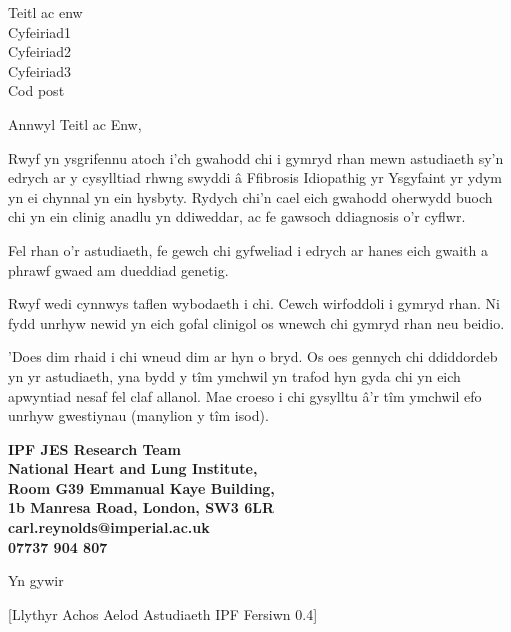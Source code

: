 \documentclass[ipfjes-centre-welsh,letterpaper,pagesize,UScommercial9]{scrlttr2}
\begin{document}
\begin{letter}{Teitl ac enw\\ Cyfeiriad1 \\ Cyfeiriad2 \\ Cyfeiriad3 \\ Cod post}


\opening{Annwyl Teitl ac Enw,}

     Rwyf yn ysgrifennu atoch i'ch gwahodd chi i gymryd rhan mewn astudiaeth sy'n edrych ar y cysylltiad rhwng swyddi \^{a} Ffibrosis Idiopathig yr Ysgyfaint yr ydym yn ei chynnal yn ein hysbyty. Rydych chi'n cael eich gwahodd oherwydd buoch chi yn ein clinig anadlu yn ddiweddar, ac fe gawsoch ddiagnosis o'r cyflwr.
     
     Fel rhan o'r astudiaeth, fe gewch chi gyfweliad i edrych ar hanes eich gwaith a phrawf gwaed am dueddiad genetig.
     
    Rwyf wedi cynnwys taflen wybodaeth i chi. Cewch wirfoddoli i gymryd rhan. Ni fydd unrhyw newid yn eich gofal clinigol os wnewch chi gymryd rhan neu beidio. 
    
    'Does dim rhaid i chi wneud dim ar hyn o bryd. Os oes gennych chi ddiddordeb yn yr astudiaeth, yna bydd y t\^{i}m ymchwil yn trafod hyn gyda chi yn eich apwyntiad nesaf fel claf allanol.
     Mae croeso i chi gysylltu \^{a}'r t\^{i}m ymchwil efo unrhyw gwestiynau (manylion y t\^{i}m isod). 

    \vspace{1cm}
    \begin{centering}
    \textbf{
    IPF JES Research Team \\  
    National Heart and Lung Institute, \\
    Room G39 Emmanual Kaye Building, \\
    1b Manresa Road, London, SW3 6LR\\
    carl.reynolds@imperial.ac.uk \\
    07737 904 807 \\
    }
    \end{centering}
    \vspace{1cm}

\closing{Yn gywir}

     \vfill \hfill [Llythyr Achos Aelod Astudiaeth IPF Fersiwn 0.4]


\end{letter}
\end{document}

